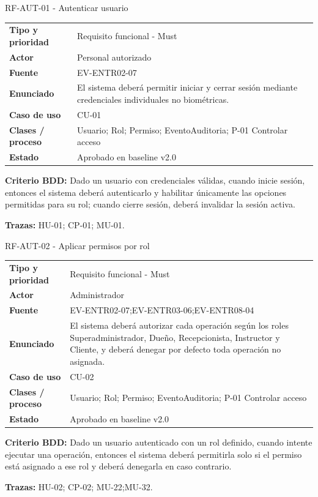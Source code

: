 \begin{reqbox}{RF-AUT-01 - Autenticar usuario}
\begin{tabularx}{\textwidth}{>{\bfseries}p{3.2cm}Y}
Tipo y prioridad & Requisito funcional - Must \\
Actor & Personal autorizado \\
Fuente & EV-ENTR02-07 \\
Enunciado & El sistema deberá permitir iniciar y cerrar sesión mediante credenciales individuales no biométricas. \\
Caso de uso & CU-01 \\
Clases / proceso & Usuario; Rol; Permiso; EventoAuditoria; P-01 Controlar acceso \\
Estado & Aprobado en baseline v2.0 \\
\end{tabularx}
\textbf{Criterio BDD:} Dado un usuario con credenciales válidas, cuando inicie sesión, entonces el sistema deberá autenticarlo y habilitar únicamente las opciones permitidas para su rol; cuando cierre sesión, deberá invalidar la sesión activa.

\textbf{Trazas:} HU-01; CP-01; MU-01.
\end{reqbox}


\begin{reqbox}{RF-AUT-02 - Aplicar permisos por rol}
\begin{tabularx}{\textwidth}{>{\bfseries}p{3.2cm}Y}
Tipo y prioridad & Requisito funcional - Must \\
Actor & Administrador \\
Fuente & EV-ENTR02-07;EV-ENTR03-06;EV-ENTR08-04 \\
Enunciado & El sistema deberá autorizar cada operación según los roles Superadministrador, Dueño, Recepcionista, Instructor y Cliente, y deberá denegar por defecto toda operación no asignada. \\
Caso de uso & CU-02 \\
Clases / proceso & Usuario; Rol; Permiso; EventoAuditoria; P-01 Controlar acceso \\
Estado & Aprobado en baseline v2.0 \\
\end{tabularx}
\textbf{Criterio BDD:} Dado un usuario autenticado con un rol definido, cuando intente ejecutar una operación, entonces el sistema deberá permitirla solo si el permiso está asignado a ese rol y deberá denegarla en caso contrario.

\textbf{Trazas:} HU-02; CP-02; MU-22;MU-32.
\end{reqbox}



